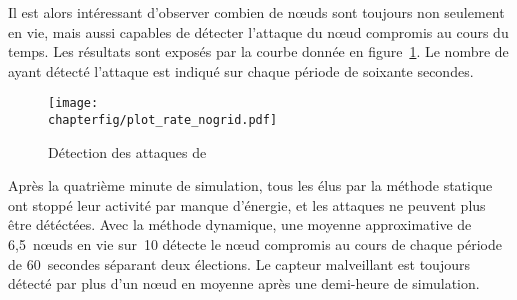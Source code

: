 Il est alors intéressant d'observer combien de nœuds sont toujours non seulement en vie, mais aussi capables de détecter l'attaque du nœud compromis au cours du temps.
Les résultats sont exposés par la courbe donnée en figure~\ref{sa:fig:detection-dos}.
Le nombre de \cns ayant détecté l'attaque est indiqué sur chaque période de soixante secondes.
\begin{figure}[H]
    \centering
    \texttt{[image: \\chapterfig/plot\_rate\_nogrid.pdf]}
    \caption{Détection des attaques de \dds}\label{sa:fig:detection-dos}
\end{figure}
Après la quatrième minute de simulation, tous les \cns élus par la méthode statique ont stoppé leur activité par manque d'énergie, et les attaques ne peuvent plus être détéctées.
Avec la méthode dynamique, une moyenne approximative de 6,5~nœuds en vie sur~10 détecte le nœud compromis au cours de chaque période de 60~secondes séparant deux élections.
Le capteur malveillant est toujours détecté par plus d'un nœud en moyenne après une demi-heure de simulation.
